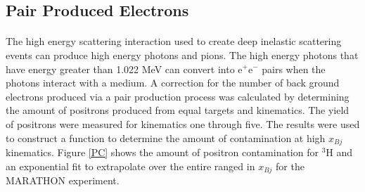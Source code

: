 


\subsection{Pair Produced Electrons}
\paragraph{} The high energy scattering interaction used to create deep inelastic scattering events can produce high energy photons and pions. The high energy photons that have energy greater than 1.022 MeV can convert into e$^+$e$^-$ pairs when the photons interact with a medium. A correction for the number of back ground electrons produced via a pair production process was calculated by determining the amount of positrons produced from equal targets and kinematics. The yield of positrons were measured for kinematics one through five. The results were used to construct a function to determine the amount of contamination at high $x_{Bj}$ kinematics. Figure \ref{PC} shows the amount of positron contamination for $^3$H and an exponential fit to extrapolate over the entire ranged in $x_{Bj}$ for the MARATHON experiment. 

